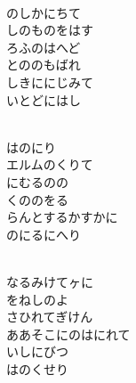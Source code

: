 \documentclass[10pt,b5j]{tarticle} %
\begin{document}
\begin{enumerate}
\begin{minipage}[c]{\blocksize}
        \vspace{\linespace}
        \item~\\
        のしかにちて\\
        しのものをはす\\
        ろふのはへど\\
        とののもばれ\\
        しきににじみて\\
        いとどにはし
        
    \end{minipage}
    \begin{minipage}[c]{\blocksize}
        
        \vspace{\linespace}
        \item~\\
        はのにり\\
        エルムのくりて\\
        にむるのの\\
        くののをる\\
        らんとするかすかに\\
        のにるにへり
        
    \end{minipage}
    \begin{minipage}[c]{\blocksize}
        
        \vspace{\linespace}
        \item~\\
        なるみけてヶに\\
        をねしのよ\\
        さひれてぎけん\\
        ああそこにのはにれて\\
        いしにびつ\\
        はのくせり
        

\end{minipage}
\end{enumerate}
\end{document}

